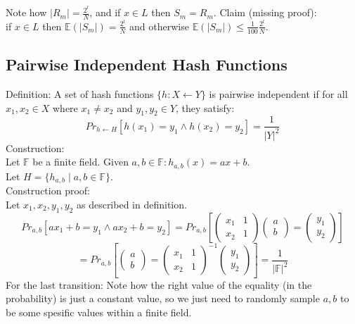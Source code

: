 Note how $|R_m|=\frac{2^l}{N}$, and if $x\in L$ then $S_m=R_m$.
Claim (missing proof):\\%
if $x\in L$ then $\mathbb{E}(|S_m|)=\frac{2^l}{N}$ and otherwise $\mathbb{E}(|S_m|)\leq \frac{1}{100}\frac{2^l}{N}$.\\

\subsection*{Pairwise Independent Hash Functions}
Definition:
A set of hash functions $\{h:X\leftarrow Y\}$ is pairwise independent if for all $x_1, x_2\in X$ where $x_1\neq x_2$ and $y_1,y_2\in Y$, they satisfy:
\[Pr_{h\leftarrow H}[h(x_1)=y_1\wedge h(x_2)=y_2]=\frac{1}{|Y|^2}\]
Construction:\\
Let $\mathbb{F}$ be a finite field.
Given $a,b\in\mathbb{F}: h_{a,b}(x)=ax+b$.\\
Let $H=\{h_{a,b}\mid a,b\in\mathbb{F}\}$.\\
Construction proof:\\
Let $x_1,x_2,y_1,y_2$ as described in definition.\\
\[
    Pr_{a,b}[ax_1+b=y_1\wedge ax_2+b=y_2]
    =Pr_{a,b}[
\begin{pmatrix}
x_1 & 1\\
x_2 & 1
\end{pmatrix}
\begin{pmatrix}
a\\
b
\end{pmatrix}
=
\begin{pmatrix}
y_1\\
y_2
\end{pmatrix}
]\]
\[
 =Pr_{a,b}[
\begin{pmatrix}
a\\
b
\end{pmatrix}
=
\begin{pmatrix}
x_1 & 1\\
x_2 & 1
\end{pmatrix}^{-1}
\begin{pmatrix}
y_1\\
y_2
\end{pmatrix}
]=\frac{1}{|\mathbb{F}|^2}\]
For the last transition: Note how the right value of the equality (in the probability) is just a constant value, so we just need to randomly sample $a,b$ to be some spesific values within a finite field.
